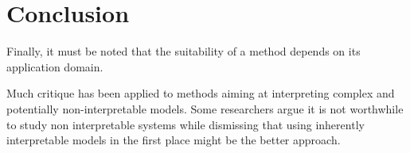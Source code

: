 \section{Conclusion}
Finally, it must be noted that the suitability of a method depends on its application domain. 


Much critique has been applied to methods aiming at interpreting complex and potentially non-interpretable models. 
Some researchers argue it is not worthwhile to study non interpretable systems while dismissing that using inherently interpretable models in the first place might be the better approach. 